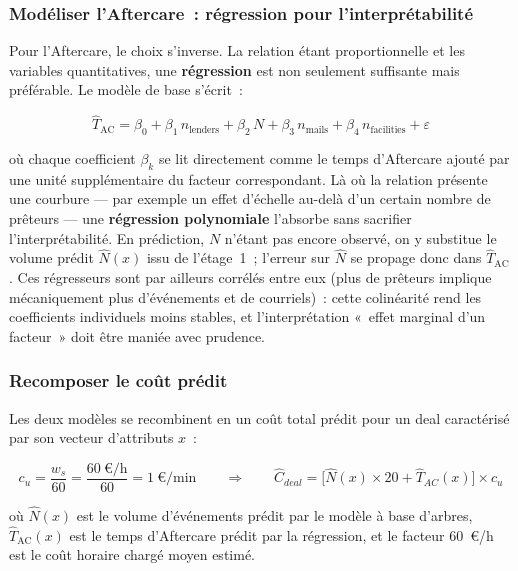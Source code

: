 \subsubsection{Modéliser l'Aftercare~: régression pour l'interprétabilité}
\label{sec:modele-ac}

Pour l'Aftercare, le choix s'inverse. La relation étant proportionnelle et les variables quantitatives, une \textbf{régression} est non seulement suffisante mais préférable. Le modèle de base s'écrit~:

\begin{equation}
\hat{T}_{\text{AC}} = \beta_0 + \beta_1 \, n_{\text{lenders}} + \beta_2 \, N
+ \beta_3 \, n_{\text{mails}} + \beta_4 \, n_{\text{facilities}} + \varepsilon
\label{eq:reg-aftercare}
\end{equation}

\noindent où chaque coefficient $\beta_k$ se lit directement comme le temps d'Aftercare ajouté par une unité supplémentaire du facteur correspondant. Là où la relation présente une courbure --- par exemple un effet d'échelle au-delà d'un certain nombre de prêteurs --- une \textbf{régression polynomiale} l'absorbe sans sacrifier l'interprétabilité.
En prédiction, $N$ n'étant pas encore observé, on y substitue le volume prédit $\hat N(x)$ issu de l'étage~1~; l'erreur sur $\hat N$ se propage donc dans $\hat T_{\text{AC}}$. Ces régresseurs sont par ailleurs corrélés entre eux (plus de prêteurs implique mécaniquement plus d'événements et de courriels)~: cette colinéarité rend les coefficients individuels moins stables, et l'interprétation «~effet marginal d'un facteur~» doit être maniée avec prudence.




\subsubsection{Recomposer le coût prédit}
\label{sec:cout-predit-recompo}

Les deux modèles se recombinent en un coût total prédit pour un deal caractérisé par son vecteur d'attributs $x$~:

\begin{equation}
c_u = \frac{w_s}{60} = \frac{60\ \text{€/h}}{60} = 1\ \text{€/min}
\qquad\Longrightarrow\qquad
\hat{C}_{deal} = \big[\hat{N}(x)\times 20 + \hat{T}_{AC}(x)\big]\times c_u
\label{eq:cout-predit-total}
\end{equation}

\noindent où $\hat{N}(x)$ est le volume d'événements prédit par le modèle à base d'arbres, $\hat{T}_{\text{AC}}(x)$ est le temps d'Aftercare prédit par la régression, et le facteur 60~€/h est le coût horaire chargé moyen estimé.

